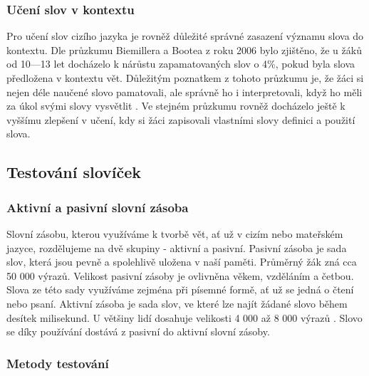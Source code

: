 \documentclass[a4paper,11pt,titlepage,fleqn]{article}
\begin{document}
        \subsubsection{Učení slov v kontextu}
            Pro učení slov cizího jazyka je rovněž důležité správné zasazení významu slova do kontextu. Dle průzkumu Biemillera a Bootea z roku 2006 bylo zjištěno, že u žáků od 10—13 let docházelo k nárůstu zapamatovaných slov o 4\%, pokud byla slova předložena v kontextu vět. Důležitým poznatkem z tohoto průzkumu je, že žáci si nejen déle naučené slovo pamatovali, ale správně ho i interpretovali, když ho měli za úkol svými slovy vysvětlit \cite{bib:beimiller}. Ve stejném průzkumu rovněž docházelo ještě k vyššímu zlepšení v učení, kdy si žáci zapisovali vlastními slovy definici a použití slova.
        
    \subsection{Testování slovíček}

        \subsubsection{Aktivní a pasivní slovní zásoba}
            Slovní zásobu, kterou využíváme k tvorbě vět, ať už v cizím nebo mateřském jazyce, rozdělujeme na dvě skupiny - aktivní a pasivní. Pasivní zásoba je sada slov, která jsou pevně a spolehlivě uložena v naší paměti. Průměrný žák zná cca 50 000 výrazů. Velikost pasivní zásoby je ovlivněna věkem, vzděláním a četbou. Slova ze této sady využíváme zejména při písemné formě, ať už se jedná o čtení nebo psaní. Aktivní zásoba je sada slov, ve které lze najít žádané slovo během desítek milisekund. U většiny lidí dosahuje velikosti 4 000 až 8 000 výrazů \cite{bib:lexikologie}. Slovo se díky používání dostává z pasivní do aktivní slovní zásoby. 

        \subsubsection{Metody testování}
            \label{test-methods}
\end{document}
